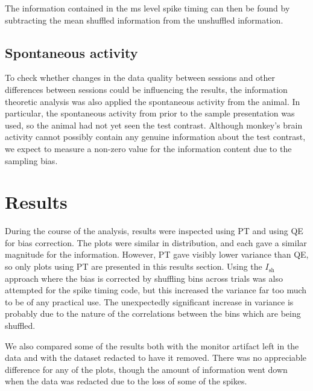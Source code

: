 The information contained in the \unit[4]{ms} level spike timing can then be found by subtracting the mean shuffled information from the unshuffled information.

\FloatBarrier
\subsection{Spontaneous activity}

To check whether changes in the data quality between sessions and other differences between sessions could be influencing the results, the information theoretic analysis was also applied the spontaneous activity from the animal.
In particular, the spontaneous activity from prior to the sample presentation was used, so the animal had not yet seen the test contrast.
Although monkey's brain activity cannot possibly contain any genuine information about the test contrast, we expect to measure a non-zero value for the information content due to the sampling bias.

\section{Results}

During the course of the analysis, results were inspected using PT and using QE for bias correction. The plots were similar in distribution, and each gave a similar magnitude for the information. However, PT gave visibly lower variance than QE, so only plots using PT are presented in this results section.
Using the $I_{\text{sh}}$ approach where the bias is corrected by shuffling bins across trials \cite{Montemurro2007} was also attempted for the spike timing code, but this increased the variance far too much to be of any practical use. The unexpectedly significant increase in variance is probably due to the nature of the correlations between the bins which are being shuffled.

We also compared some of the results both with the monitor artifact left in the data and with the dataset redacted to have it removed. There was no appreciable difference for any of the plots, though the amount of information went down when the data was redacted due to the loss of some of the spikes.

